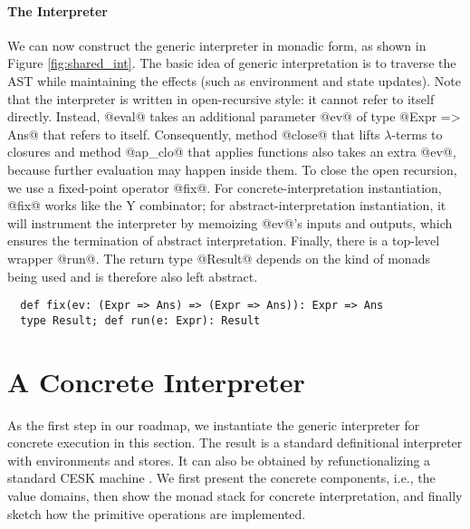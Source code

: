 \paragraph{The Interpreter} We can now construct the generic interpreter
in monadic form, as shown in Figure \ref{fig:shared_int}. The basic idea
of generic interpretation is to traverse the AST
while maintaining the effects (such as environment and state updates).
Note that the interpreter is written in open-recursive style: it cannot
refer to itself directly. Instead, @eval@ takes an additional parameter @ev@ of
type @Expr => Ans@ that refers to itself. Consequently, method @close@ that
lifts $\lambda$-terms to closures and method @ap_clo@ that applies functions also
takes an extra @ev@, because further evaluation may happen inside them.
To close the open recursion, we use a fixed-point operator @fix@.
For concrete-interpretation instantiation, @fix@ works like the Y combinator;
for abstract-interpretation instantiation, it will instrument the interpreter
by memoizing @ev@'s inputs and outputs, which ensures the termination of
abstract interpretation.
Finally, there is a top-level wrapper @run@. The return type @Result@
depends on the kind of monads being used and is therefore also left abstract.
\begin{lstlisting}
  def fix(ev: (Expr => Ans) => (Expr => Ans)): Expr => Ans
  type Result; def run(e: Expr): Result
\end{lstlisting}


\section{A Concrete Interpreter} \label{unstaged_conc}

As the first step in our roadmap, we instantiate the generic interpreter for
concrete execution in this section. The result is a standard definitional
interpreter with environments and stores. It can also be obtained by
refunctionalizing a standard CESK machine \cite{Felleisen:1987:CAH:41625.41654,
DBLP:conf/ppdp/AgerBDM03}. We first present the concrete components, i.e., the
value domains, then show the monad stack for concrete interpretation, and finally
sketch how the primitive operations are implemented.

